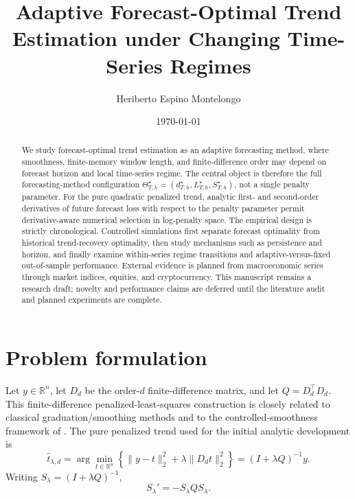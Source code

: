 \documentclass[11pt]{article}
\title{Adaptive Forecast-Optimal Trend Estimation under Changing Time-Series Regimes}
\author{Heriberto Espino Montelongo}
\date{\today}
\newcommand{\R}{\mathbb{R}}
\newcommand{\Dt}{D_d}
\begin{document}
\maketitle

\begin{abstract}
We study forecast-optimal trend estimation as an adaptive forecasting method,
where smoothness, finite-memory window length, and finite-difference order may
depend on forecast horizon and local time-series regime. The central object is
therefore the full forecasting-method configuration
\(\Theta^\star_{T,h}=(d^\star_{T,h},L^\star_{T,h},S^\star_{T,h})\), not a
single penalty parameter. For the pure quadratic penalized trend, analytic
first- and second-order derivatives of future forecast loss with respect to the
penalty parameter permit derivative-aware numerical selection in log-penalty
space. The empirical design is strictly chronological. Controlled simulations
first separate forecast optimality from historical trend-recovery optimality,
then study mechanisms such as persistence and horizon, and finally examine
within-series regime transitions and adaptive-versus-fixed out-of-sample
performance. External evidence is planned from macroeconomic series through
market indices, equities, and cryptocurrency. This manuscript remains a
research draft; novelty and performance claims are deferred until the
literature audit and planned experiments are complete.
\end{abstract}

\section{Problem formulation}
Let $y\in\R^n$, let $\Dt$ be the order-$d$ finite-difference matrix, and let
$Q=\Dt^\top\Dt$. This finite-difference penalized-least-squares construction is closely related
to classical graduation/smoothing methods and to the controlled-smoothness
framework of \citet{guerrero2007penalized,whittaker1923graduation}. The pure
penalized trend used for the initial analytic development is
\begin{equation}
\label{eq:pure-trend}
\widehat t_{\lambda,d}
=
\arg\min_{t\in\R^n}
\left\{
\|y-t\|_2^2+\lambda\|\Dt t\|_2^2
\right\}
=
(I+\lambda Q)^{-1}y.
\end{equation}
Writing $S_\lambda=(I+\lambda Q)^{-1}$,
\begin{equation}
\label{eq:smoother-derivative}
S_\lambda'=-S_\lambda Q S_\lambda.
\end{equation}
\end{document}
